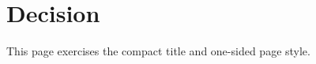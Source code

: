 \documentclass[title-page=false,two-sided=false]{ieeeufgcs}
\begin{document}
\maketitle

\section{Decision}

This page exercises the compact title and one-sided page style.
\end{document}
